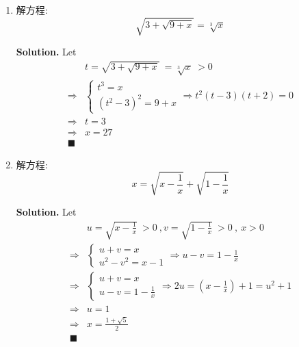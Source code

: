 \documentclass[UTF8]{article}
\begin{document}
\begin{enumerate}
        \item 解方程: $$ \sqrt{3+\sqrt{9+x}} = \sqrt[3]{x} $$

        \noindent \textbf{Solution. }  Let
        \begin{align*}
           & t = \sqrt{3 + \sqrt{9+x}} \  = \sqrt[3]{x} \ > 0  \\
            \Longrightarrow &
            \left \{
                \begin{aligned}
                t^3 = x \\
                (t^2 - 3)^2 = 9 + x
                \end{aligned}
                \Longrightarrow t^2(t-3)(t+2) = 0
            \right. \\
            \Longrightarrow & t = 3 \\
            \Longrightarrow & x = 27 \\
            \blacksquare 
        \end{align*}

        \item 解方程: $$ x = \sqrt{x - \frac{1}{x}} + \sqrt{1 - \frac{1}{x}} $$

        \noindent \textbf{Solution. }  Let
        \begin{align*}
           & u = \sqrt{x - \frac{1}{x}} \ > 0  \ , v = \sqrt{1 - \frac{1}{x}} \ >0 \ , \ x > 0 \\
            \Longrightarrow &
            \left \{
                \begin{aligned}
                u + v = x \\
                u^2 - v^2 = x - 1
                \end{aligned}
                \Longrightarrow u - v = 1 - \frac{1}{x}
            \right. \\
            \Longrightarrow &
            \left\{
                \begin{aligned}
                    u + v = x \\
                    u - v = 1 - \frac{1}{x}
                \end{aligned}
                \Longrightarrow 2u = (x - \frac{1}{x}) + 1 = u^2 + 1
            \right. \\ 
            \Longrightarrow & u = 1 \\
            \Longrightarrow & x = \frac{1+\sqrt{5}}{2} \\
            \blacksquare 
        \end{align*}


    \end{enumerate}
\end{document}
